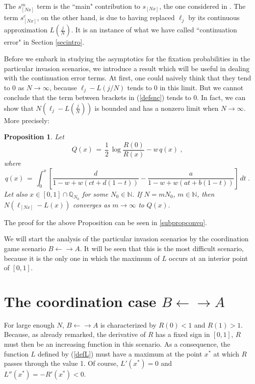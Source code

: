\documentclass[12pt]{article}
\newtheorem{proposition}{Proposition}
\begin{document}
The $s_{[Nx]}^m$ term is the ``main" contribution to $s_{[Nx]}$, the one considered in \cite{AntalScheuring}.
The term $s_{[Nx]}^c$, on the other hand, is due to having replaced $\ell_j$ by its continuous approximation $L(\frac{j}{N})$. It is an instance of what we have called ``continuation error" in Section \ref{secintro}.  

Before we embark in studying the asymptotics for the fixation probabilities in the particular invasion scenarios, we introduce a result which will be useful in dealing with the continuation error terms. At first, one could naively think that they tend to 0 as $N \rightarrow \infty$, because $\ell_j-L(j/N)$ tends to 0 in this limit. But we cannot  conclude that the term between brackets in (\ref{defsnc})  tends to 0. In fact, we can show that $N(\ell_j-L(\frac{j}{N}))$ is bounded and has a nonzero limit when $N \rightarrow \infty$. More precisely:
\begin{proposition}  \label{propconvq}
Let
\begin{equation}  \label{defQ}
Q(x)\,=\, \frac{1}{2}\, \log \frac{R(0)}{R(x)}- w \, q(x) \;,
\end{equation}
where 
\begin{equation}  \label{defq}
q(x) \,=\, \int_0^x \left[\frac{d}{1-w+w(ct+d(1-t))}- \frac{a}{1-w+w(at+b(1-t))} \right] \, dt \;.
\end{equation}
Let also  $x \in [0,1] \cap \mathbb{Q}_{N_0}$ for some $N_0 \in \mathbb{N}$. If $N=m N_0$, $m \in \mathbb{N}$, then $N(\ell_{[Nx]}-L(x))$ converges as $m \rightarrow \infty$ to $Q(x)$.
\end{proposition}	

The proof for the above Proposition can be seen in \ref{subpropconvq}.

We will start the analysis of the particular invasion scenarios by the coordination game scenario $B\leftarrow \rightarrow A$. It will be seen that this is the most difficult scenario, because it is the only one in which the maximum of $L$ occurs at an interior point of $[0,1]$.

\section{The coordination case $B\leftarrow \rightarrow A$}\label{seccoord}
 For large enough $N$, $B\leftarrow \rightarrow A$ is characterized by  $R(0)<1$ and $R(1)>1$. Because, as already remarked, the derivative of $R$ has a fixed sign in $[0,1]$, $R$ must then be an increasing function in this scenario. As a consequence, the function $L$ defined by (\ref{defL}) must have a maximum at the point $x^{\ast}$ at which $R$ passes through the value 1. Of course, $L'(x^{\ast})=0$ and $L''(x^{\ast})= -R'(x^{\ast})<0$.
\end{document}
